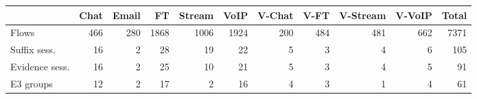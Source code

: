 \begin{tabular}{lrrrrrrrrrr}
\toprule
 & Chat & Email & FT & Stream & VoIP & V-Chat & V-FT & V-Stream & V-VoIP & Total \\
\midrule
Flows & 466 & 280 & 1868 & 1006 & 1924 & 200 & 484 & 481 & 662 & 7371 \\
Suffix sess. & 16 & 2 & 28 & 19 & 22 & 5 & 3 & 4 & 6 & 105 \\
Evidence sess. & 16 & 2 & 25 & 10 & 21 & 5 & 3 & 4 & 5 & 91 \\
E3 groups & 12 & 2 & 17 & 2 & 16 & 4 & 3 & 1 & 4 & 61 \\
\bottomrule
\end{tabular}
